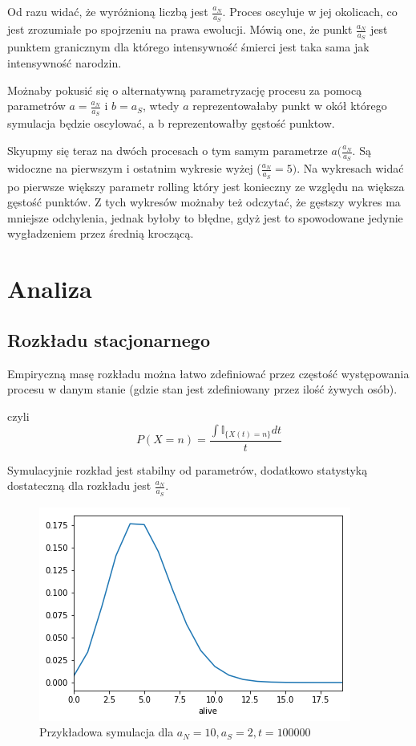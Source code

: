 \documentclass{article}
\begin{document}
Od razu widać, że wyróżnioną liczbą jest $\frac{a_N}{a_S}$. Proces oscyluje w jej okolicach, co jest zrozumiałe po spojrzeniu na prawa ewolucji. Mówią one, że punkt $\frac{a_N}{a_S}$ jest punktem granicznym dla którego intensywność śmierci jest taka sama jak intensywność narodzin. 

Możnaby pokusić się o alternatywną parametryzację procesu za pomocą parametrów $a = \frac{a_N}{a_S}$ i $b = a_S$, wtedy $a$ reprezentowałaby punkt w okół którego symulacja będzie oscylować, a b reprezentowałby gęstość punktow.

Skyupmy się teraz na dwóch procesach o tym samym parametrze $a (\frac{a_N}{a_S}$. Są widoczne na pierwszym i ostatnim wykresie wyżej ($\frac{a_N}{a_S} = 5)$. Na wykresach widać po pierwsze większy parametr rolling który jest konieczny ze względu na większa gęstość punktów. Z tych wykresów możnaby też odczytać, że gęstszy wykres ma mniejsze odchylenia, jednak byłoby to błędne, gdyż jest to spowodowane jedynie wygładzeniem przez średnią kroczącą.
\section{Analiza}
\subsection{Rozkładu stacjonarnego}

Empiryczną masę rozkładu można łatwo zdefiniować przez częstość występowania procesu w danym stanie (gdzie stan jest zdefiniowany przez ilość żywych osób).

czyli \[P(X = n) = \frac{\int \mathbb{I}_{\{X(t) = n\}} dt}{t}  \]

Symulacyjnie rozkład jest stabilny od parametrów, dodatkowo statystyką dostateczną dla rozkładu jest $\frac{a_N}{a_S}$.

\begin{figure}[h!]
\centering
\includegraphics[width=0.6\linewidth]{rozklad10,2}
\caption{Przykładowa symulacja dla $a_N=10, a_S=2, t=100000$}
\end{figure}
\end{document}
